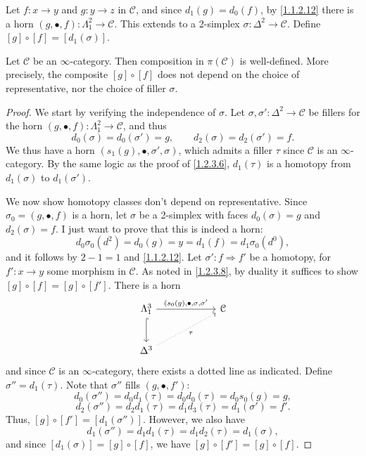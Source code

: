 Let $f : x \to y$ and $g : y \to z$ in $\mathcal{C} $, and since $d_1(g)=d_0(f)$, by \cref{1.1.2.12} there is a horn $(g,\bullet,f ): \Lambda _1^2 \to \mathcal{C} $. This extends to a 2-simplex $\sigma : \Delta ^2 \to \mathcal{C} $. Define $[g]\circ [f]=[d_1(\sigma )]$.

\begin{proposition}\label{1.2.3.9}
	Let $\mathcal{C} $ be an $\infty $-category. Then composition in $\pi (\mathcal{C} )$ is well-defined. More precisely, the composite $[g]\circ [f]$ does not depend on the choice of representative, nor the choice of filler $\sigma $.
\end{proposition}
\begin{proof}
	We start by verifying the independence of $\sigma $. Let $\sigma ,\sigma ' : \Delta ^2 \to \mathcal{C} $ be fillers for the horn $(g,\bullet,f) : \Lambda _1^2 \to \mathcal{C} $, and thus
	\[
		d_0(\sigma )=d_0(\sigma ')=g,\qquad d_2(\sigma )=d_2(\sigma ')=f
	.\]
	We thus have a horn $(s_1(g),\bullet,\sigma ',\sigma )$, which admits a filler $\tau $ since $\mathcal{C} $ is an $\infty $-category. By the same logic as the proof of \cref{1.2.3.6}, $d_1(\tau )$ is a homotopy from $d_1(\sigma )$ to $d_1(\sigma ')$.

	We now show homotopy classes don't depend on representative. Since $\sigma _0=(g,\bullet,f)$ is a horn, let $\sigma $ be a 2-simplex with faces $d_0(\sigma )=g$ and $d_2(\sigma )=f$. I just want to prove that this is indeed a horn:
	\[
		d_0\sigma _0(d^2)=d_0(g)=y=d_1(f)=d_1\sigma _0(d^0)
	,\]
	and it follows by $2-1=1$ and \cref{1.1.2.12}. Let $\sigma ' : f \Rightarrow f'$ be a homotopy, for $f': x \to y$ some morphism in $\mathcal{C} $. As noted in \cref{1.2.3.8}, by duality it suffices to show $[g]\circ [f]=[g]\circ [f']$. There is a horn
	\[\begin{tikzcd}[row sep = 2.5em, column sep = 6em]
	\Lambda _1^3 \ar[" (s_0(g)\text{,} \bullet\text{,} \sigma \text{,} \sigma ' ", r] \ar[hook, d]  & \mathcal{C}  \\
	\Delta ^3 \ar[" \tau  "', dotted, ur]  & 
	\end{tikzcd}\]
	and since $\mathcal{C} $ is an $\infty $-category, there exists a dotted line as indicated. Define $\sigma ''=d_1(\tau )$. Note that $\sigma ''$ fills $(g,\bullet,f')$:
	\[
		d_0(\sigma '')=d_0d_1(\tau )=d_0d_0(\tau )=d_0s_0(g)=g,
	\]
	\[
		d_2(\sigma '')=d_2d_1(\tau )=d_1d_3(\tau )=d_1(\sigma ')=f'
	.\]
	Thus, $[g]\circ [f']=[d_1(\sigma '')]$. However, we also have
	\[
		d_1(\sigma '')=d_1d_1(\tau )=d_1d_2(\tau )=d_1(\sigma ),
	\]
	and since $[d_1(\sigma )]=[g]\circ [f]$, we have $[g]\circ [f']=[g]\circ [f]$.
\end{proof}

